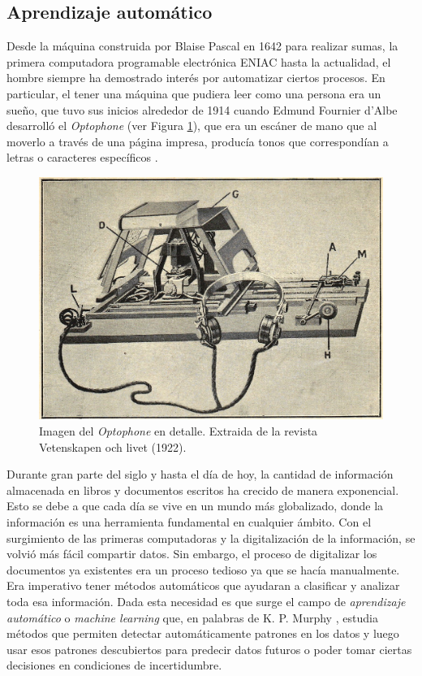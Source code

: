 \subsection{Aprendizaje automático}

	Desde la máquina construida por Blaise Pascal en 1642 para realizar sumas, la primera computadora programable electrónica ENIAC hasta la actualidad, el hombre siempre ha demostrado interés por automatizar ciertos procesos. En particular, el tener una máquina que pudiera leer como una persona era un sueño, que tuvo sus inicios alrededor de 1914 cuando Edmund Fournier d'Albe desarrolló el \textit{Optophone} (ver Figura \ref{fig: Optophone}), que era un escáner de mano que al moverlo a través de una página impresa, producía tonos que correspondían	a letras o caracteres específicos \cite{EFdAlbe}.

			\begin{figure}[htbp]
				\centering
				\centerline{
					\includegraphics[scale=1]{img/Optophone.jpg}
				}
				\caption[Optophone]{Imagen del \textit{Optophone} en detalle. Extraida de la revista Vetenskapen och livet (1922).}
				\label{fig: Optophone}
			\end{figure}
			
	Durante gran parte del siglo  y hasta el día de hoy, la cantidad de información almacenada en libros y documentos escritos ha crecido de manera exponencial. Esto se debe a que cada día se vive en un mundo más globalizado, donde la información es una herramienta fundamental en cualquier ámbito. Con el surgimiento de las primeras computadoras y la digitalización de la información, se volvió más fácil compartir datos. Sin embargo, el proceso de digitalizar los documentos ya existentes era un proceso tedioso ya que se hacía manualmente. Era imperativo tener métodos automáticos que ayudaran a clasificar y analizar toda esa información. Dada esta necesidad es que surge el campo de \textit{aprendizaje automático} o \textit{machine learning} que, en palabras de K. P. Murphy \cite{Murphy12}, estudia métodos que permiten detectar automáticamente patrones en los datos y luego usar esos patrones descubiertos para predecir datos futuros o poder tomar ciertas decisiones en condiciones de incertidumbre. 
	
